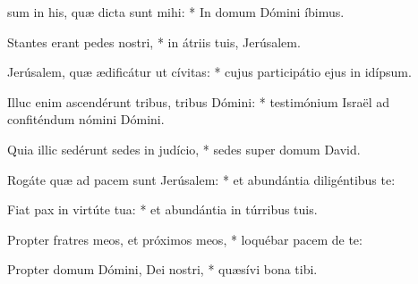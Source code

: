 \begin{psalmus}

     sum in his, quæ dicta sunt mihi: * In domum Dómini íbimus.

    Stantes erant pedes nostri, * in átriis tuis, Jerúsalem.

    Jerúsalem, quæ ædificátur ut cívitas: * cujus participátio ejus in idípsum.

    Illuc enim ascendérunt tribus, tribus Dómini: * testimónium Israël ad confiténdum nómini Dómini.

    Quia illic sedérunt sedes in judício, * sedes super domum David.

    Rogáte quæ ad pacem sunt Jerúsalem: * et abundántia diligéntibus te:

    Fiat pax in virtúte tua: * et abundántia in túrribus tuis.

    Propter fratres meos, et próximos meos, * loquébar pacem de te:

    Propter domum Dómini, Dei nostri, * quæsívi bona tibi.

\end{psalmus}
